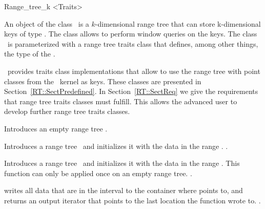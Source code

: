\begin{ccClassTemplate}{Range_tree_k <Traits>}

\ccDefinition

An object of the class  \ccClassName\ is a $k$-dimensional range tree
that can store k-dimensional keys of type . 
The class allows to perform
window queries on the keys.  The class \ccClassName\ is parameterized with
a range tree traits class  that defines, among other things, 
the type of the . 

\cgal\ provides traits class implementations that allow to use 
the range tree with point classes from the \cgal\ kernel as keys.
These classes are presented in Section~\ref{RT::SectPredefined}.  In
Section~\ref{RT::SectReq} we give the requirements that range tree traits
classes must fulfill. This allows the advanced user to develop further
range tree traits classes.



\ccTypes




\ccCreation

{Introduces an empty range tree \ccVar.}

{Introduces a range tree \ccVar\ and initializes it with the data
in the range \ccc{[first, last)}.
\ccPrecond {}.}

\ccOperations

%
{Introduces a range tree \ccVar\ and initializes it with the data
in the range \ccc{[first, last)}. This function can only be applied
once on an empty range tree.
\ccPrecond {}.}


%
{writes all data that are in the interval  to the container
where  points to, and returns an output iterator that points
to the last location the function wrote to.
\ccPrecond  {}.}

\end{ccClassTemplate}

